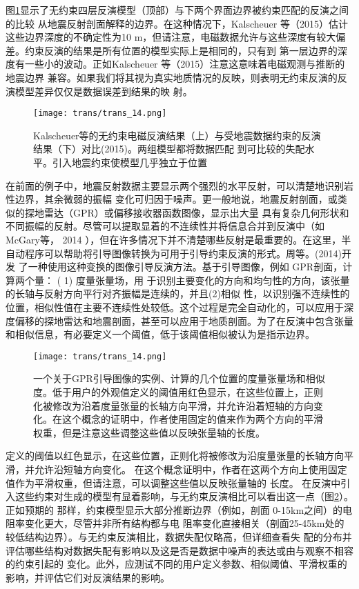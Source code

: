 图\ref{trans14}显示了无约束四层反演模型（顶部）与下两个界面边界被约束匹配的反演之间的比较 从地震反射剖面解释的边界。在这种情况下，Kalscheuer 等（2015）估计这些边界深度的不确定性为10 m，但请注意，电磁数据允许与这些深度有较大偏差。约束反演的结果是所有位置的模型实际上是相同的，只有到 第一层边界的深度有一些小的波动。正如Kalscheuer 等（2015）注意这意味着电磁观测与推断的地震边界 兼容。如果我们将其视为真实地质情况的反映，则表明无约束反演的反演模型差异仅仅是数据误差到结果的映 射。

\begin{figure}[H]
    \centering
    \texttt{[image: trans/trans\_14.png]}
    \setcounter{figure}{6}
    \caption{Kalscheuer等的无约束电磁反演结果（上）与受地震数据约束的反演结果（下）对比(2015)。两组模型都将数据匹配 到可比较的失配水平。引入地震约束使模型几乎独立于位置}\label{trans14}
    
\end{figure}


在前面的例子中，地震反射数据主要显示两个强烈的水平反射，可以清楚地识别岩性边界，其余微弱的振幅 变化可归因于噪声。更一般地说，地震反射剖面，或类似的探地雷达（GPR）或偏移接收器函数图像，显示出大量 具有复杂几何形状和不同振幅的反射。尽管可以提取显着的不连续性并将信息合并到反演中（如McGary等， 2014 ），但在许多情况下并不清楚哪些反射是最重要的。在这里，半自动程序可以帮助将引导图像转换为可用于引导约束反演的形式。周等。(2014)开发 了一种使用这种变换的图像引导反演方法。基于引导图像，例如 GPR剖面，计算两个量： ( 1) 度量张量场，用 于识别主要变化的方向和均匀性的方向，该张量的长轴与反射方向平行对齐振幅是连续的，并且(2)相似 性，以识别强不连续性的位置，相似性值在主要不连续性处较低。这个过程是完全自动化的，可以应用于深 度偏移的探地雷达和地震剖面，甚至可以应用于地质剖面。为了在反演中包含张量和相似信息，有必要定义一个阈值，低于该阈值相似被认为是指示边界。

\begin{figure}[H]
    \centering
    \texttt{[image: trans/trans\_14.png]}     
    \caption{一个关于GPR引导图像的实例、计算的几个位置的度量张量场和相似度。低于用户的外观值定义的阈值用红色显示，在这些位置上，正则化被修改为沿着度量张量的长轴方向平滑，并允许沿着短轴的方向变化。在这个概念的证明中，作者使用固定的值来作为两个方向的平滑权重，但是注意这些调整这些值以反映张量轴的长度。}
    \label{trans15}
\end{figure}


定义的阈值以红色显示，在这些位置，正则化将被修改为沿度量张量的长轴方向平滑，并允许沿短轴方向变化。 在这个概念证明中，作者在这两个方向上使用固定值作为平滑权重，但请注意，可以调整这些值以反映张量轴的 长度。 在反演中引入这些约束对生成的模型有显着影响，与无约束反演相比可以看出这一点（图\ref{trans15}）。正如预期的 那样，约束模型显示大部分推断边界（例如，剖面 0-15km之间）的电阻率变化更大，尽管并非所有结构都与电 阻率变化直接相关（剖面25-45km处的较低结构边界）。与无约束反演相比，数据失配仅略高，但详细查看失 配的分布并评估哪些结构对数据失配有影响以及这是否是数据中噪声的表达或由与观察不相容的约束引起的 变化。此外，应测试不同的用户定义参数、相似阈值、平滑权重的影响，并评估它们对反演结果的影响。

